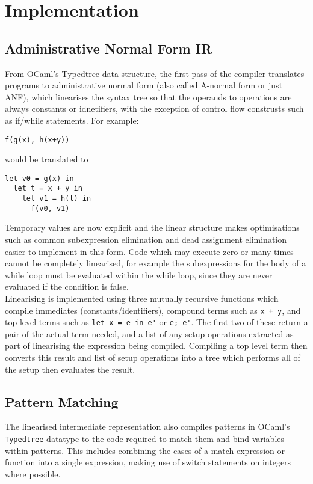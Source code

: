 \chapter{Implementation}

\section{Administrative Normal Form IR}
From OCaml's Typedtree data structure, the first pass of the compiler translates programs to administrative normal form (also called A-normal form or just ANF), which linearises the syntax tree so that the operands to operations are always constants or idnetifiers, with the exception of control flow construsts such as if/while statements. For example:

\begin{verbatim}
f(g(x), h(x+y))
\end{verbatim}
would be translated to
\begin{verbatim}
let v0 = g(x) in
  let t = x + y in 
    let v1 = h(t) in
      f(v0, v1)
\end{verbatim}

Temporary values are now explicit and the linear structure makes optimisations such as common subexpression elimination and dead assignment elimination easier to implement in this form. Code which may execute zero or many times cannot be completely linearised, for example the subexpressions for the body of a while loop must be evaluated within the while loop, since they are never evaluated if the condition is false. \\
Linearising is implemented using three mutually recursive functions which compile immediates (constants/identifiers), compound terms such as \verb|x + y|, and top level terms such as \verb|let x = e in e'| or \verb|e; e'|. The first two of these return a pair of the actual term needed, and a list of any setup operations extracted as part of linearising the expression being compiled. Compiling a top level term then converts this result and list of setup operations into a tree which performs all of the setup then evaluates the result.

\section{Pattern Matching}
The linearised intermediate representation also compiles patterns in OCaml's \verb|Typedtree| datatype to the code required to match them and bind variables within patterns. This includes combining the cases of a match expression or function into a single expression, making use of switch statements on integers where possible. 


